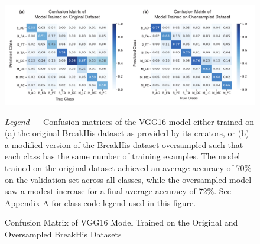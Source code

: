 \begin{figure}[ht!]
	\begin{center}
		\caption{Confusion Matrix of VGG16 Model Trained on the Original and Oversampled BreakHis Datasets \label{fig:confmat}}
	\end{center}
	\includegraphics[width=170mm]{figures/deepduct/confusion_matrix.pdf}
	\begin{singlespace}
		\textit{Legend} --- Confusion matrices of the VGG16 model either trained on (a) the original BreakHis dataset as provided by its creators, or (b) a modified version of the BreakHis dataset oversampled such that each class has the same number of training examples. The model trained on the original dataset achieved an average accuracy of 70\% on the validation set across all classes, while the oversampled model saw a modest increase for a final average accuracy of 72\%. See Appendix A for class code legend used in this figure.
	\end{singlespace}
	
\end{figure}